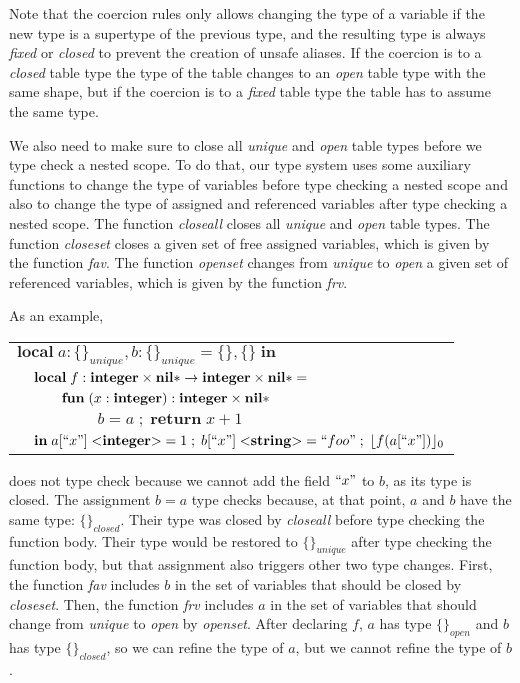 Note that the coercion rules only allows changing the type
of a variable if the new type is a supertype of the previous type,
and the resulting type is always \emph{fixed} or \emph{closed}
to prevent the creation of unsafe aliases.
If the coercion is to a \emph{closed} table type the type of the
table changes to an \emph{open} table type with the same shape,
but if the coercion is to a \emph{fixed} table type the table
has to assume the same type.

We also need to make sure to close all \emph{unique} and \emph{open}
table types before we type check a nested scope.
To do that, our type system uses some auxiliary functions to change
the type of variables before type checking a nested scope and
also to change the type of assigned and referenced variables after
type checking a nested scope.
The function \emph{closeall} closes all \emph{unique} and \emph{open} table types.
The function \emph{closeset} closes a given set of free assigned variables,
which is given by the function \emph{fav}.
The function \emph{openset} changes from \emph{unique} to \emph{open}
a given set of referenced variables, which is given by the function \emph{frv}.

As an example,
\begin{center}
\begin{tabular}{llll}
\multicolumn{4}{l}{$\mathbf{local} \; a:\{\}_{unique}, b:\{\}_{unique} = \{\}, \{\} \; \mathbf{in}$}\\
& \multicolumn{3}{l}{$\mathbf{local} \; f:\mathbf{integer} \times \mathbf{nil}{*} \rightarrow \mathbf{integer} \times \mathbf{nil}{*} =$}\\
& & \multicolumn{2}{l}{$\mathbf{fun} \; (x:\mathbf{integer}):\mathbf{integer} \times \mathbf{nil}{*}$}\\
& & & \multicolumn{1}{l}{$b = a \;;\; \mathbf{return} \; x + 1$}\\
& \multicolumn{3}{l}{$\mathbf{in} \; a[``x"] \; {<}\mathbf{integer}{>} = 1 \;;\; b[``x"] \; {<}\mathbf{string}{>} = ``foo" \;;\; \lfloor f(a[``x"]) \rfloor_{0}$}
\end{tabular}
\end{center}
does not type check because we cannot add the field
$``x"$ to $b$, as its type is closed.
The assignment $b = a$ type checks because, at that point,
$a$ and $b$ have the same type: $\{\}_{closed}$.
Their type was closed by \emph{closeall} before type checking
the function body.
Their type would be restored to $\{\}_{unique}$ after type checking
the function body, but that assignment also triggers other two type changes.
First, the function \emph{fav} includes $b$ in the set of variables
that should be closed by \emph{closeset}.
Then, the function \emph{frv} includes $a$ in the set of variables
that should change from \emph{unique} to \emph{open} by \emph{openset}.
After declaring $f$, $a$ has type $\{\}_{open}$ and $b$ has type $\{\}_{closed}$,
so we can refine the type of $a$, but we cannot refine the type of $b$.

